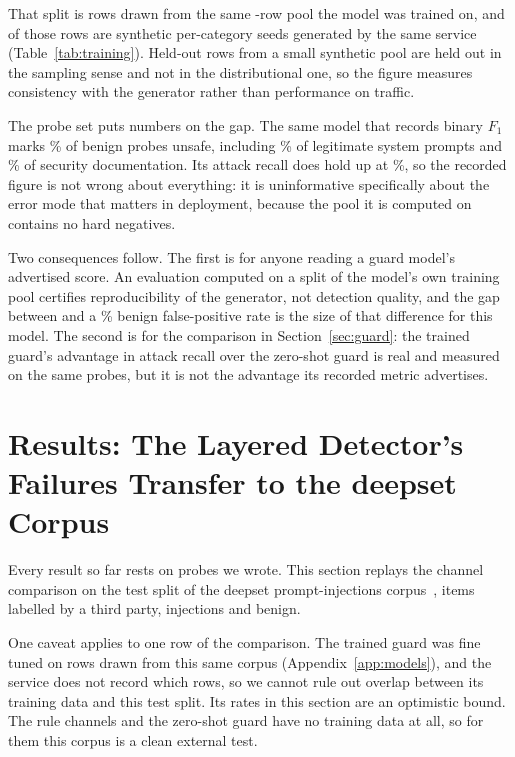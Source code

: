 \documentclass[conference]{IEEEtran}
\begin{document}
That split is \NTestSplitTr{} rows drawn from the same \NTrainTotalTr{}-row
pool the model was trained on, and \NSyntheticRowsTr{} of those rows are
synthetic per-category seeds generated by the same service
(Table~\ref{tab:training}). Held-out rows from a small synthetic pool are
held out in the sampling sense and not in the distributional one, so the figure
measures consistency with the generator rather than performance on traffic.

The probe set puts numbers on the gap. The same model that records
\ReportedFOneTr{} binary $F_1$ marks \BinFprTr{}\% of benign probes unsafe,
including \BinFprLegitTr{}\% of legitimate system prompts and
\BinFprDocTr{}\% of security documentation. Its attack recall does hold up at
\BinTprTr{}\%, so the recorded figure is not wrong about everything: it is
uninformative specifically about the error mode that matters in deployment,
because the pool it is computed on contains no hard negatives.

Two consequences follow. The first is for anyone reading a guard model's
advertised score. An evaluation computed on a split of the model's own training
pool certifies reproducibility of the generator, not detection quality, and the
gap between \ReportedFOneTr{} and a \BinFprTr{}\% benign false-positive rate
is the size of that difference for this model. The second is for the
comparison in Section~\ref{sec:guard}: the trained guard's advantage in attack
recall over the zero-shot guard is real and measured on the same probes, but it
is not the advantage its recorded metric advertises.

\section{Results: The Layered Detector's Failures Transfer to the deepset Corpus}\label{sec:external}

Every result so far rests on probes we wrote. This section replays the channel
comparison on the test split of the deepset prompt-injections
corpus~\cite{deepset_promptinjections}, \NExtRows{} items labelled by a third
party, \NExtInjection{} injections and \NExtBenign{} benign.

One caveat applies to one row of the comparison. The trained guard was fine
tuned on \NExternalRowsTr{} rows drawn from this same corpus
(Appendix~\ref{app:models}), and the service does not record which rows, so we
cannot rule out overlap between its training data and this test split. Its
rates in this section are an optimistic bound. The rule channels and the zero-shot
guard have no training data at all, so for them this corpus is a clean external
test.
\end{document}
